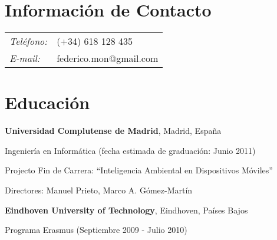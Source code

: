\documentclass[margin,line]{resume}
\begin{document}

\begin{resume}
\section{\sc Información de Contacto}
\vspace{.05in}
\begin{tabular}{@{}p{0.5in}p{2in}}
{\it Teléfono:} &(+34) 618 128 435 \\
{\it E-mail:} &{ federico.mon@gmail.com}\\
\end{tabular}



\section{\sc Educación}
{\bf Universidad Complutense de Madrid}, Madrid, España\\
\vspace*{-.1in}
\begin{list1}
\item[] Ingeniería en Informática (fecha estimada
  de graduación: Junio 2011)
\begin{list2}
\vspace*{.05in}
\item Projecto Fin de Carrera:  ``Inteligencia Ambiental en Dispositivos Móviles'' 
\item Directores:  Manuel Prieto, Marco A. Gómez-Martín
\end{list2}
\end{list1}

{\bf Eindhoven University of Technology}, Eindhoven, Países Bajos\\
\vspace*{-.1in}
\begin{list1}
\item[] Programa Erasmus (Septiembre 2009 - Julio 2010)
\end{list1}


\end{resume}
\end{document}
